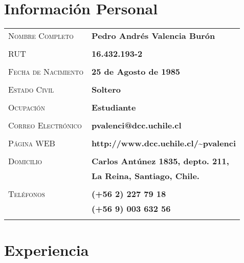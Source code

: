 \documentclass[letterpaper, oneside, final, 12pt]{scrartcl}
\newcommand{\gray}{\rowcolor[gray]{.90}}
\begin{document}
\begin{center}
\textsc{\Huge{}}

\section{Informaci\'on Personal}

\begin{tabularx}{0.97\linewidth}{>{\raggedleft\scshape}p{5cm}X}

\gray	Nombre Completo		& \textbf{Pedro Andr\'es Valencia Bur\'on} \\
	& \\
\gray	RUT					& \textbf{16.432.193-2} \\
	& \\
\gray	Fecha de Nacimiento & \textbf{25 de Agosto de 1985} \\	
	& \\
\gray	Estado Civil 		& \textbf{Soltero} \\
	& \\
\gray	Ocupaci\'on 		& \textbf{Estudiante} \\
	& \\
\gray	Correo Electr\'onico	& \textbf{pvalenci@dcc.uchile.cl} \\
	& \\
\gray	P\'agina WEB			& \textbf{http://www.dcc.uchile.cl/\~{}pvalenci} \\
	& \\
\gray	Domicilio			& \textbf{Carlos Ant\'unez 1835, depto. 211,} \\
\gray						& \textbf{La Reina, Santiago, Chile.} \\
	& \\
\gray	Tel\'efonos			& \textbf{(+56 2) 227 79 18} \\
\gray						& \textbf{(+56 9) 003 632 56} \\
	& \\

\end{tabularx}

\section{Experiencia}


\end{center}
\end{document}
